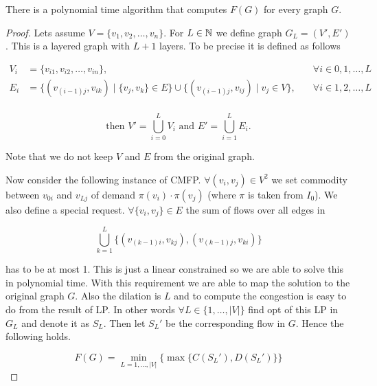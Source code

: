 \begin{claim}
	There is a polynomial time algorithm that computes $F(G)$ for every graph $G$.
\end{claim}

\begin{proof}
	Lets assume $V = \{v_{1}, v_{2}, \dots, v_{n}\}$. For $L \in \mathbb{N}$ we define graph $G_{L} = (V', E')$. This is a layered graph with $L+1$ layers. To be precise it is defined as follows
	
	$$
	\begin{aligned}
		V_{i} &= \{v_{i1}, v_{i2}, \dots, v_{in}\}, &\quad \forall i \in 0, 1, \dots, L \\
		E_{i} &= \{(v_{(i-1)j}, v_{ik}) \mid \{v_{j}, v_{k}\} \in E \} \cup \{(v_{(i-1)j}, v_{ij}) \mid v_{j} \in V\}, &\quad \forall i \in 1,2, \dots, L \\
	\end{aligned}
	$$
	
	$$
	\text{then } V' = \bigcup_{i = 0}^{L} V_{i} \text{ and } E' = \bigcup_{i=1}^{L} E_{i}.
	$$
	
	Note that we do not keep $V$ and $E$ from the original graph.
	
	Now consider the following instance of CMFP. $\forall (v_{i}, v_{j}) \in V^2$ we set commodity between $v_{0i}$ and $v_{Lj}$ of demand $\pi(v_{i}) \cdot \pi(v_{j})$ (where $\pi$ is taken from $I_{0}$). We also define a special request. $\forall \{v_{i}, v_{j}\} \in E$ the sum of flows over all edges in
	
	$$
	\bigcup_{k = 1}^{L} \{ (v_{(k-1)i}, v_{kj}), (v_{(k-1)j}, v_{ki}) \}
	$$
	
	has to be at most 1. This is just a linear constrained so we are able to solve this in polynomial time. With this requirement we are able to map the solution to the original graph $G$. Also the dilation is $L$ and to compute the congestion is easy to do from the result of LP. In other words $\forall L \in \{1, \dots, |V|\}$ find opt of this LP in $G_{L}$ and denote it as $S_{L}$. Then let $S_{L}'$ be the corresponding flow in $G$. Hence the following holds.
	
	$$
	F(G) = \min_{L = 1, \dots, |V|} \{ \max \{ C(S_{L}'), D(S_{L}')\} \}
	$$
\end{proof}


